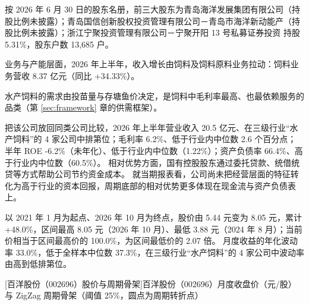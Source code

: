  按 2026 年 6 月 30 日的股东名册，前三大股东为青岛海洋发展集团有限公司（持股比例未披露）；青岛国信创新股权投资管理有限公司－青岛市海洋新动能产（持股比例未披露）；浙江宁聚投资管理有限公司－宁聚开阳 13 号私募证券投资 持股 5.31\%，股东户数 13,685 户。

 业务与产能层面，2026 年上半年，收入增长由饲料及饲料原料业务拉动：饲料业务营收 8.37 亿元（同比 +34.33\%）。

 水产饲料的需求由投苗量与存塘鱼价决定，是饲料中毛利率最高、也最依赖服务的品类（第 \ref{sec:framework} 章的供需框架）。

 把该公司放回同类公司比较，2026 年上半年营业收入 20.5 亿元、在三级行业“水产饲料”的 4 家公司中排第位；毛利率 6.2\%、低于行业内中位数 2.6 个百分点；半年 ROE -6.2\%（未年化）、低于行业内中位数（1.22\%）；资产负债率 66.4\%、高于行业内中位数（60.5\%）。 相对优势方面，国有控股股东通过委托贷款、统借统贷等方式帮助公司节约资金成本。 就当期报表看，公司尚未把经营层面的特征转化为高于行业的资本回报，周期底部的相对优势更多体现在现金流与资产负债表上。

 以 2021 年 1 月为起点、2026 年 10 月为终点，股价由 5.44 元变为 8.05 元，累计 +48.0\%，区间最高 8.05 元（2026 年 10 月）、最低 3.88 元（2024 年 8 月）；当前价相当于区间最高价的 100.0\%，为区间最低价的 2.07 倍。 月度收益的年化波动率 33.0\%，低于全样本中位数 37.3\%，在三级行业“水产饲料”的 4 家公司中波动率由高到低排第位。

\begin{center}
\begin{minipage}{\textwidth}\centering
{}

[百洋股份（002696）股价与周期骨架]{百洋股份（002696）月度收盘价（元/股）与 ZigZag 周期骨架（阈值 25\%，圆点为周期转折点）}
\end{minipage}
\end{center}

